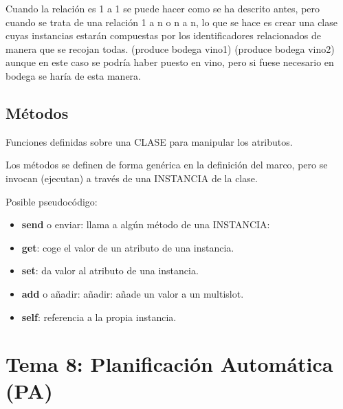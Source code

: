 \documentclass[12pt, twoside, openright]{report} %
\begin{document}
Cuando la relación es 1 a 1 se puede hacer como se ha descrito antes, pero cuando se trata de una relación 1 a n o n a n, lo que se hace es crear una clase cuyas instancias estarán compuestas por los identificadores relacionados de manera que se recojan todas. (produce bodega vino1) (produce bodega vino2) aunque en este caso se podría haber puesto en vino, pero si fuese necesario en bodega se haría de esta manera.
\section{Métodos}
Funciones definidas sobre una CLASE para manipular los atributos.

Los métodos se definen de forma genérica en la definición del marco, pero se invocan  (ejecutan) a través de una INSTANCIA de la clase.

Posible pseudocódigo:
\begin{itemize}
	\item \textbf{send} o enviar: llama a algún método de una INSTANCIA:
	\item \textbf{get}: coge el valor de un atributo de una instancia.
	\item \textbf{set}: da valor al atributo de una instancia.
	\item \textbf{add} o añadir: añadir: añade un valor a un multislot.
	\item \textbf{self}: referencia a la propia instancia.
\end{itemize}

\chapter{Tema 8: Planificación Automática (PA)}
\end{document}

